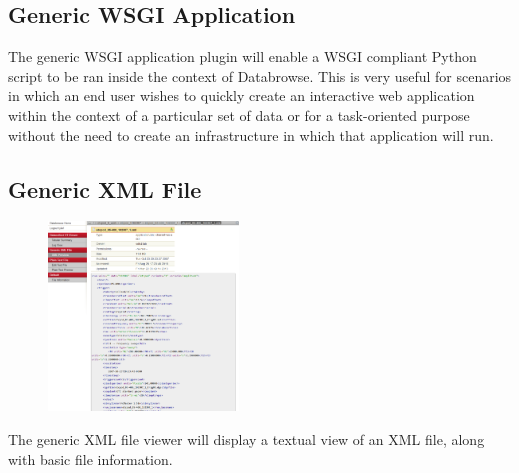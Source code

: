 \documentclass[10pt]{article}
\begin{document}
\endgroup

\hfill \break
\hfill \break
\hfill \break
\hfill \break
\hfill \break
\hfill \break
\hfill \break
\hfill \break
\hfill \break
\hfill \break
\hfill \break
\hfill \break
\hfill \break


\begin{changemargin}{0in}{220.6pt}
\subsection{Generic WSGI Application}
The generic WSGI application plugin will enable a WSGI compliant Python script to be ran inside the context of Databrowse.  This is very useful for scenarios in which an end user wishes to quickly create an interactive web application within the context of a particular set of data or for a task-oriented purpose without the need to create an infrastructure in which that application will run.
\end{changemargin}


\begingroup
\setlength\intextsep{0pt}
\subsection{Generic XML File}
\begin{figure}
		\includegraphics[width=0.45\textwidth]{Generic_XML_File.png}
\end{figure}
The generic XML file viewer will display a textual view of an XML file, along with basic file information.

\endgroup

\clearpage
\begingroup
\setlength\intextsep{0pt}
\end{document}
